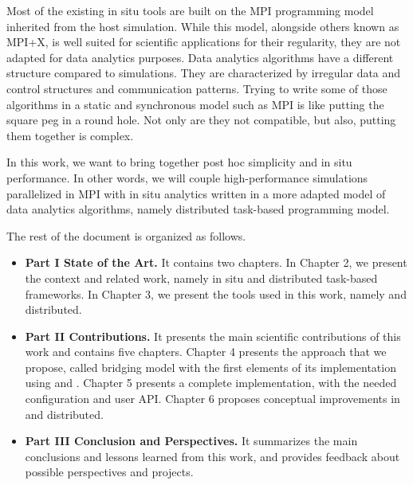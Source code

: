 Most of the existing in situ tools are built on the MPI programming model inherited from the host simulation. While this model, alongside others known as MPI+X, is well suited for scientific applications for their regularity, they are not adapted for data analytics purposes. 
Data analytics algorithms have a different structure compared to simulations. They are characterized by irregular data and control structures and communication patterns. Trying to write some of those algorithms in a static and synchronous model such as MPI is like putting the square peg in a round hole. Not only are they not compatible, but also, putting them together is complex.

In this work, we want to bring together post hoc simplicity and in situ performance. In other words, we will couple high-performance simulations parallelized in MPI with in situ analytics written in a more adapted model of data analytics algorithms, namely distributed task-based programming model. 

The rest of the document is organized as follows.
\begin{itemize}

    \item \textbf{Part I State of the Art.} It contains two chapters. In Chapter 2, we present the context and related work, namely in situ and distributed task-based frameworks. In Chapter 3, we present the tools used in this work, namely \pdi and \dask distributed.    

    \item \textbf{Part II Contributions.} It presents the main scientific contributions of this work and contains five chapters. Chapter 4 presents the approach that we propose, called \deisa bridging model with the first elements of its implementation using \dask and \pdi. Chapter 5 presents a complete implementation, with the needed configuration and user API. Chapter 6 proposes conceptual improvements in \deisa and \dask distributed. 

    \item \textbf{Part III Conclusion and Perspectives.} It summarizes the main conclusions and lessons learned from this work, and provides feedback about possible perspectives and projects. 
    
\end{itemize}
    



